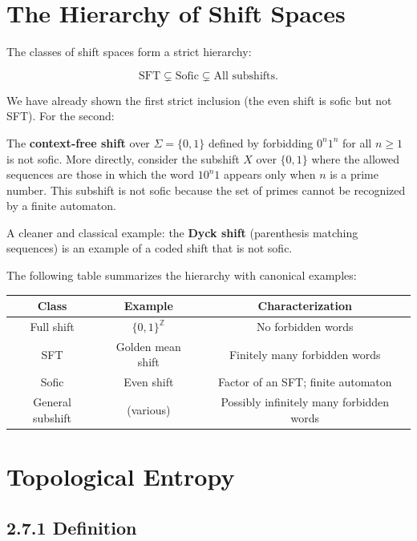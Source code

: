 \section{The Hierarchy of Shift Spaces}

The classes of shift spaces form a strict hierarchy:

\[\text{SFT} \subsetneq \text{Sofic} \subsetneq \text{All subshifts}.\]

We have already shown the first strict inclusion (the even shift is sofic but not SFT). For the second:

\begin{example}
The \textbf{context-free shift} over $\Sigma = \{ 0, 1\} $ defined by forbidding $0^n 1^n$ for all $n \geq 1$ is not sofic. More directly, consider the subshift $X$ over $\{ 0, 1\} $ where the allowed sequences are those in which the word $10^n1$ appears only when $n$ is a prime number. This subshift is not sofic because the set of primes cannot be recognized by a finite automaton.

A cleaner and classical example: the \textbf{Dyck shift} (parenthesis matching sequences) is an example of a coded shift that is not sofic.

The following table summarizes the hierarchy with canonical examples:

\begin{center}
\begin{tabular}{ccc}
\toprule
Class & Example & Characterization \\
\midrule
Full shift & $\{ 0,1\} ^{\mathbb{Z}}$ & No forbidden words \\
SFT & Golden mean shift & Finitely many forbidden words \\
Sofic & Even shift & Factor of an SFT; finite automaton \\
General subshift & (various) & Possibly infinitely many forbidden words \\
\bottomrule
\end{tabular}
\end{center}
\end{example}



\section{Topological Entropy}

\subsection{2.7.1 Definition}

